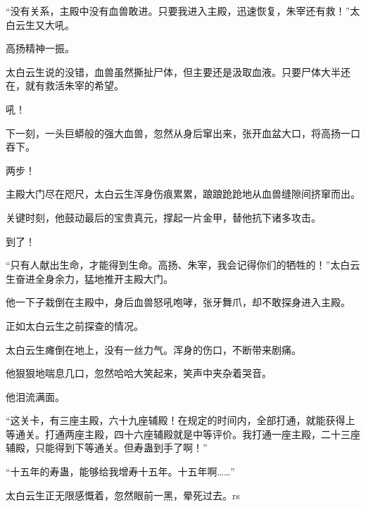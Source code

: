 \begin{this_body}
“没有关系，主殿中没有血兽敢进。只要我进入主殿，迅速恢复，朱宰还有救！”太白云生又大吼。

高扬精神一振。

太白云生说的没错，血兽虽然撕扯尸体，但主要还是汲取血液。只要尸体大半还在，就有救活朱宰的希望。

吼！

下一刻，一头巨蟒般的强大血兽，忽然从身后窜出来，张开血盆大口，将高扬一口吞下。

两步！

主殿大门尽在咫尺，太白云生浑身伤痕累累，踉踉跄跄地从血兽缝隙间挤窜而出。

关键时刻，他鼓动最后的宝贵真元，撑起一片金甲，替他抗下诸多攻击。

到了！

“只有人献出生命，才能得到生命。高扬、朱宰，我会记得你们的牺牲的！”太白云生奋进全身余力，猛地推开主殿大门。

他一下子栽倒在主殿中，身后血兽怒吼咆哮，张牙舞爪，却不敢探身进入主殿。

正如太白云生之前探查的情况。

太白云生瘫倒在地上，没有一丝力气。浑身的伤口，不断带来剧痛。

他狠狠地喘息几口，忽然哈哈大笑起来，笑声中夹杂着哭音。

他泪流满面。

“这关卡，有三座主殿，六十九座辅殿！在规定的时间内，全部打通，就能获得上等通关。打通两座主殿，四十六座辅殿就是中等评价。我打通一座主殿，二十三座辅殿，只能得到下等通关。但寿蛊到手了啊！”

“十五年的寿蛊，能够给我增寿十五年。十五年啊……”

太白云生正无限感慨着，忽然眼前一黑，晕死过去。rs

\end{this_body}

